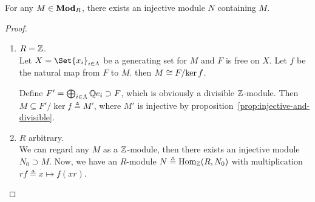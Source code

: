 \begin{theorem} \label{thm:every-module-is-in-injective-module}
 For any $M \in \mathbf{Mod}_R$, there exists an injective module $N$ containing $M$.
 \begin{proof} $ $
   \begin{enumerate}[label={\bf Case \arabic*:}]
      \item $R = \mathbb{Z}$. \\
        Let $X = \Set{x_i}_{i \in \Lambda}$ be a generating set for $M$
        and $F$ is free on $X$. Let $f$ be the natural map from $F$
        to $M$. then $M \cong {F}/{\ker f}$.

        Define $F' = \bigoplus_{i \in \Lambda} \mathbb{Q} e_i \supset F$,
        which is obviously a divisible $\mathbb{Z}$-module.
        Then $M \subseteq F' / \ker f \triangleq M'$,
        where $M'$ is injective by proposition~\ref{prop:injective-and-divisible}.

      \item $R$ arbitrary. \\
        We can regard any $M$ as a $\mathbb{Z}$-module, then there exists an injective
        module $N_0 \supset M$.
        Now, we have an $R$-module $N \triangleq \operatorname{Hom}_{\mathbb{Z}}(R, N_0)$
        with multiplication $rf \triangleq x \mapsto f(x r)$.


\end{enumerate}
\end{proof}
\end{theorem}
